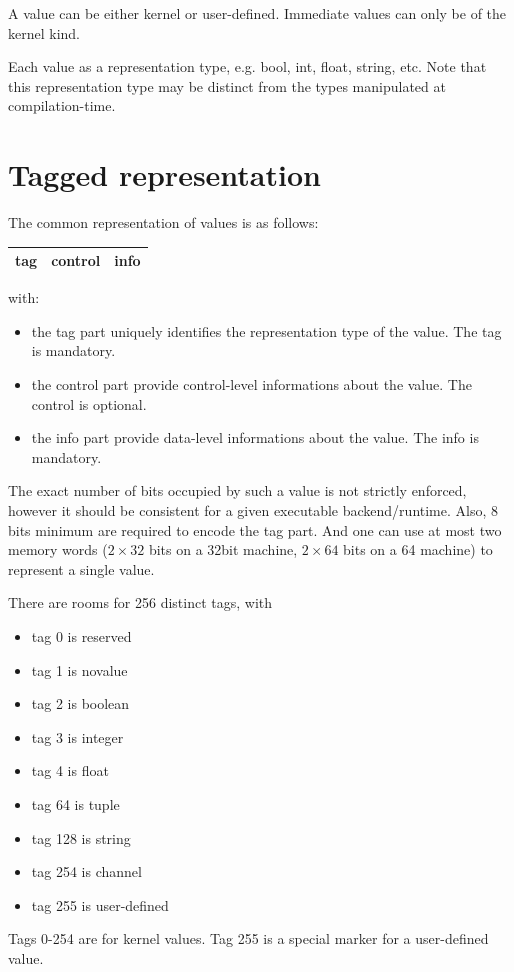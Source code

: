 \documentclass[a4paper,11pt]{article}
\begin{document}
A value can be either kernel or user-defined. Immediate values
 can only be of the kernel kind.

Each value as a representation type, e.g. bool, int, float, string, etc.
Note that this representation type may be distinct from the types
manipulated at compilation-time.

\section{Tagged representation}

The common representation of  values is as follows:

\begin{tabular}{|l|l|l|}
\hline
tag & control & info \\
\hline
\end{tabular}

with:

\begin{itemize}
\item the tag part uniquely identifies the representation type of the value. The tag is mandatory.
\item the control part provide control-level informations about the value. The control is optional.
\item the info part provide data-level informations about the value. The info is mandatory.
\end{itemize}

The exact number of bits occupied by such a value is not strictly enforced, 
however it should be consistent for a given executable backend/runtime. 
Also, 8 bits minimum are required to encode the tag part.
And one can use at most two memory words ($2\times 32$ bits on a 32bit machine, $2 \times 64$ bits on a 64 machine) to
represent a single value.

There are rooms for 256 distinct tags, with
\begin{itemize}
\item tag 0 is reserved
\item tag 1 is novalue
\item tag 2 is boolean
\item tag 3 is integer
\item tag 4 is float
\item tag 64 is tuple
\item tag 128 is string
\item tag 254 is channel
\item tag 255 is user-defined
\end{itemize}

Tags 0-254 are for kernel values.
Tag 255 is a special marker for a user-defined value.
\end{document}
